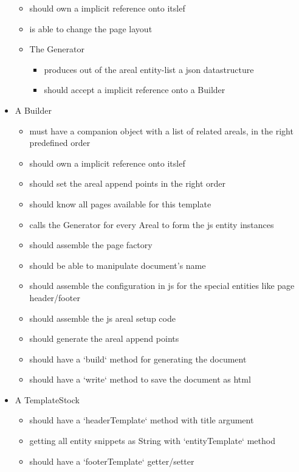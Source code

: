 \begin{itemize}
\begin{itemize}
    \item should own a implicit reference onto itslef
    \item is able to change the page layout
    \item The Generator 
    \begin{itemize}
      \item produces out of the areal entity-list a json datastructure
      \item should accept a implicit reference onto a Builder
    \end{itemize}
  \end{itemize}
  \item A Builder 
  \begin{itemize}
    \item must have a companion object with a list of related areals, in the right predefined order
    \item should own a implicit reference onto itslef
    \item should set the areal append points in the right order
    \item should know all pages available for this template
    \item calls the Generator for every Areal to form the js entity instances
    \item should assemble the page factory
    \item should be able to manipulate document's name
    \item should assemble the configuration in js for the special entities like page header/footer
    \item should assemble the js areal setup code
    \item should generate the areal append points
    \item should have a `build` method for generating the document
    \item should have a `write` method to save the document as html
  \end{itemize}
  \item A TemplateStock
  \begin{itemize}
    \item should have a `headerTemplate` method with title argument
    \item getting all entity snippets as String with `entityTemplate` method
    \item should have a `footerTemplate` getter/setter
  \end{itemize}
\end{itemize}

